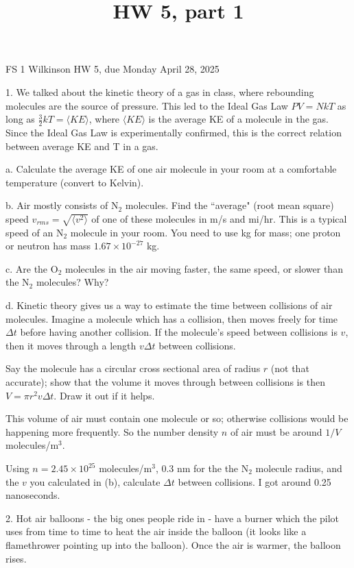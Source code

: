 \documentclass[12pt]{article}
\title{HW 5, part 1}
\begin{document}
\setlength{\parindent}{0pt}
\setlength{\parskip}{3mm}

FS 1 Wilkinson HW 5, due Monday April 28, 2025

1. We talked about the kinetic theory of a gas in class, where rebounding molecules are the source of pressure. This led to the Ideal Gas Law $PV=NkT$ as long as $\frac{3}{2}kT=\langle KE \rangle$, where $\langle KE \rangle$ is the average KE of a molecule in the gas. Since the Ideal Gas Law is experimentally confirmed, this is the correct relation between average KE and T in a gas.

a. Calculate the average KE of one air molecule in your room at a comfortable temperature (convert to Kelvin).

b. Air mostly consists of N$_2$ molecules. Find the ``average" (root mean square) speed $v_{rms}=\sqrt{\langle v^2 \rangle}$ of one of these molecules in m/s and mi/hr. This is a typical speed of an N$_2$ molecule in your room. You need to use kg for mass; one proton or neutron has mass $1.67 \times 10^{-27}$ kg.

c. Are the O$_2$ molecules in the air moving faster, the same speed, or slower than the N$_2$ molecules? Why?

d. Kinetic theory gives us a way to estimate the time between collisions of air molecules. Imagine a molecule which has a collision, then moves freely for time $\Delta t$ before having another collision. If the molecule's speed between collisions is $v$, then it moves through a length $v \Delta t$ between collisions. 

Say the molecule has a circular cross sectional area of radius $r$ (not that accurate); show that the volume it moves through between collisions is then $V=\pi r^2 v \Delta t$. Draw it out if it helps.

This volume of air must contain one molecule or so; otherwise collisions would be happening more frequently. So the number density $n$ of air must be around $1/V$ molecules/m$^3$.

Using $n=2.45 \times 10^{25}$ molecules/m$^3$, 0.3 nm for the the N$_2$ molecule radius, and the $v$ you calculated in (b), calculate $\Delta t$ between collisions. I got around 0.25 nanoseconds. 



2. Hot air balloons - the big ones people ride in - have a burner which the pilot uses from time to time to heat the air inside the balloon (it looks like a flamethrower pointing up into the balloon). Once the air is warmer, the balloon rises.
\end{document}
